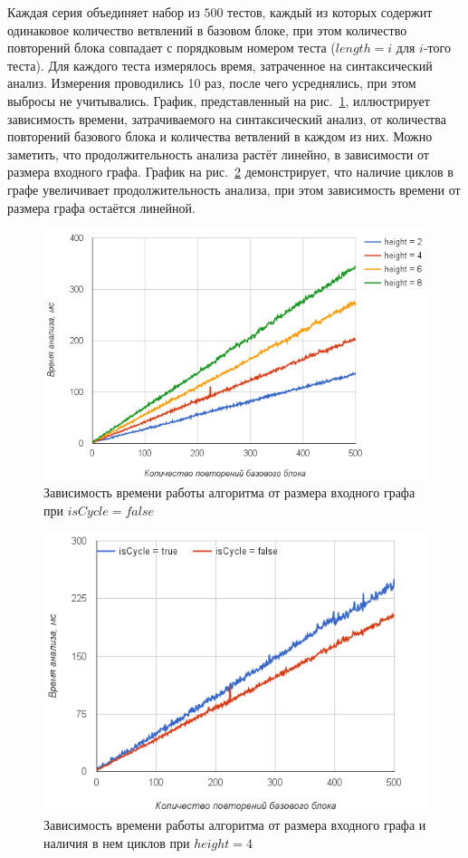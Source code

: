 Каждая серия объединяет набор из $500$ тестов, каждый из которых содержит одинаковое количество ветвлений в базовом блоке, при этом количество повторений блока совпадает с порядковым номером теста ($length=i$ для $i$-того теста). Для каждого теста измерялось время, затраченное на синтаксический анализ. Измерения проводились 10 раз, после чего усреднялись, при этом выбросы не учитывались. График, представленный на рис.~\ref{diffheights}, иллюстрирует зависимость времени, затрачиваемого на синтаксический анализ, от количества повторений базового блока и количества ветвлений в каждом из них. Можно заметить, что продолжительность анализа растёт линейно, в зависимости от размера входного графа. График на рис.~\ref{CycleVsLinear} демонстрирует, что наличие циклов в графе увеличивает продолжительность анализа, при этом зависимость времени от размера графа остаётся линейной. 
\begin{figure}[H]
 \centering
 \includegraphics[width=\textwidth]{Verbitskaya/pics/diffheights.png}
 \caption{Зависимость времени работы алгоритма от размера входного графа при $isCycle=false$}
 \label{diffheights}
\end{figure}
\begin{figure}[H]
 \centering
 \includegraphics[width=\textwidth]{Verbitskaya/pics/heigh4.png}
 \caption{Зависимость времени работы алгоритма от размера входного графа и наличия в нем циклов при $height=4$}
 \label{CycleVsLinear}
\end{figure}

